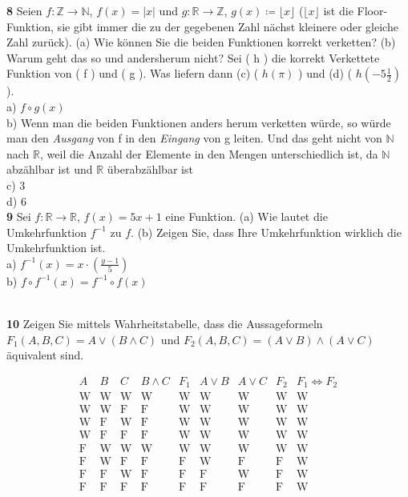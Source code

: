 \documentclass[11pt]{article}
\begin{document}
{{    \textbf{8} Seien $ f : \mathbb{Z} \rightarrow \mathbb{N} $, $ f(x) = |x| $ und $ g : \mathbb{R} \rightarrow \mathbb{Z} $, $ g(x) \coloneqq \lfloor x \rfloor $ ($\lfloor x \rfloor$ ist die Floor-Funktion, sie gibt immer die zu der gegebenen Zahl nächst kleinere oder gleiche Zahl zurück).
    (a) Wie können Sie die beiden Funktionen korrekt verketten? (b) Warum geht das so und andersherum nicht?
    Sei ( h ) die korrekt Verkettete Funktion von ( f ) und ( g ). Was liefern dann (c) ( $h(\pi)$ ) und (d) ( $h\left(-5\frac{1}{2}\right)$ ).\\
    a) $ f \circ g(x) $\\
    b) Wenn man die beiden Funktionen anders herum verketten würde, so würde man den \textit{Ausgang} von f in den \textit{Eingang} von g leiten. Und das geht nicht von $\mathbb{N}$ nach $\mathbb{R}$, weil die Anzahl der Elemente in den Mengen unterschiedlich ist, da $\mathbb{N}$ abzählbar ist und $\mathbb{R}$ überabzählbar ist\\
    c) 3\\
    d) 6\\

    \textbf{9} Sei $ f : \mathbb{R} \rightarrow \mathbb{R} $, $ f(x) = 5x + 1 $ eine Funktion. (a) Wie lautet die Umkehrfunktion $f^{-1}$ zu $f$. (b) Zeigen Sie, dass Ihre Umkehrfunktion wirklich die Umkehrfunktion ist.\\
    a) $f^{-1}(x) = x \cdot \left(\frac{y-1}{5}\right)$\\
    b) $f \circ f^{-1}(x) = f^{-1} \circ f(x)$\\\

    \textbf{10} Zeigen Sie mittels Wahrheitstabelle, dass die Aussageformeln $F_1(A,B,C) = A \lor (B \land C)$ und $F_2(A,B,C) = (A \lor B) \land (A \lor C)$ äquivalent sind.

\[
    \begin{array}{ccc|c|c|c|c|c|c|c}
        A & B & C & B \land C & F_1 & A \lor B & A \lor C & F_2 & F_1 \Leftrightarrow F_2 \\
        \hline
        \text{W} & \text{W} & \text{W} & \text{W} & \text{W} & \text{W} & \text{W} & \text{W} & \text{W} \\
        \text{W} & \text{W} & \text{F} & \text{F} & \text{W} & \text{W} & \text{W} & \text{W} & \text{W} \\
        \text{W} & \text{F} & \text{W} & \text{F} & \text{W} & \text{W} & \text{W} & \text{W} & \text{W} \\
        \text{W} & \text{F} & \text{F} & \text{F} & \text{W} & \text{W} & \text{W} & \text{W} & \text{W} \\
        \text{F} & \text{W} & \text{W} & \text{W} & \text{W} & \text{W} & \text{W} & \text{W} & \text{W} \\
        \text{F} & \text{W} & \text{F} & \text{F} & \text{F} & \text{W} & \text{F} & \text{F} & \text{W} \\
        \text{F} & \text{F} & \text{W} & \text{F} & \text{F} & \text{F} & \text{W} & \text{F} & \text{W} \\
        \text{F} & \text{F} & \text{F} & \text{F} & \text{F} & \text{F} & \text{F} & \text{F} & \text{W} \\
    \end{array}
\]

}}
\end{document}

